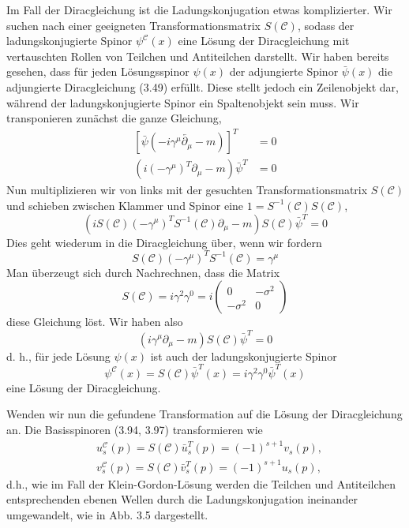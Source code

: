\documentclass[10pt, letterpaper]{article}
\begin{document}
Im Fall der Diracgleichung ist die Ladungskonjugation etwas komplizierter. Wir suchen nach einer geeigneten Transformationsmatrix $S(\mathcal{C})$, sodass der ladungskonjugierte Spinor $\psi^{\mathcal{C}}(x)$ eine Lösung der Diracgleichung mit vertauschten Rollen von Teilchen und Antiteilchen darstellt. Wir haben bereits gesehen, dass für jeden Lösungsspinor $\psi(x)$ der adjungierte Spinor $\bar{\psi}(x)$ die adjungierte Diracgleichung (3.49) erfüllt. Diese stellt jedoch ein Zeilenobjekt dar, während der ladungskonjugierte Spinor ein Spaltenobjekt sein muss. Wir transponieren zunächst die ganze Gleichung,
$$
\begin{aligned}
{\left[\bar{\psi}\left(-i \gamma^{\mu} \overleftarrow{\partial_{\mu}}-m\right)\right]^{T} } & =0 \\
\left(i\left(-\gamma^{\mu}\right)^{T} \partial_{\mu}-m\right) \bar{\psi}^{T} & =0
\end{aligned}
$$
Nun multiplizieren wir von links mit der gesuchten Transformationsmatrix $S(\mathcal{C})$ und schieben zwischen Klammer und Spinor eine $1=S^{-1}(\mathcal{C}) S(\mathcal{C})$,
$$
\left(i S(\mathcal{C})\left(-\gamma^{\mu}\right)^{T} S^{-1}(\mathcal{C}) \partial_{\mu}-m\right) S(\mathcal{C}) \bar{\psi}^{T}=0
$$
Dies geht wiederum in die Diracgleichung über, wenn wir fordern
$$
S(\mathcal{C})\left(-\gamma^{\mu}\right)^{T} S^{-1}(\mathcal{C})=\gamma^{\mu}
$$
Man überzeugt sich durch Nachrechnen, dass die Matrix
$$
S(\mathcal{C})=i \gamma^{2} \gamma^{0}=i\left(\begin{array}{cc}
0 & -\sigma^{2} \\
-\sigma^{2} & 0
\end{array}\right)
$$
diese Gleichung löst. Wir haben also
$$
\left(i \gamma^{\mu} \partial_{\mu}-m\right) S(\mathcal{C}) \bar{\psi}^{T}=0
$$
d. h., für jede Lösung $\psi(x)$ ist auch der ladungskonjugierte Spinor
$$
\psi^{\mathcal{C}}(x)=S(\mathcal{C}) \bar{\psi}^{T}(x)=i \gamma^{2} \gamma^{0} \bar{\psi}^{T}(x)
$$
eine Lösung der Diracgleichung. 

Wenden wir nun die gefundene Transformation auf die Lösung der Diracgleichung an. Die Basisspinoren (3.94, 3.97) transformieren wie
$$
\begin{aligned}
& u_{s}^{\mathcal{C}}(p)=S(\mathcal{C}) \bar{u}_{s}^{T}(p)=(-1)^{s+1} v_{s}(p), \\
& v_{s}^{\mathcal{C}}(p)=S(\mathcal{C}) \bar{v}_{s}^{T}(p)=(-1)^{s+1} u_{s}(p),
\end{aligned}
$$
d.h., wie im Fall der Klein-Gordon-Lösung werden die Teilchen und Antiteilchen entsprechenden ebenen Wellen durch die Ladungskonjugation ineinander umgewandelt, wie in Abb. 3.5 dargestellt.
\end{document}
